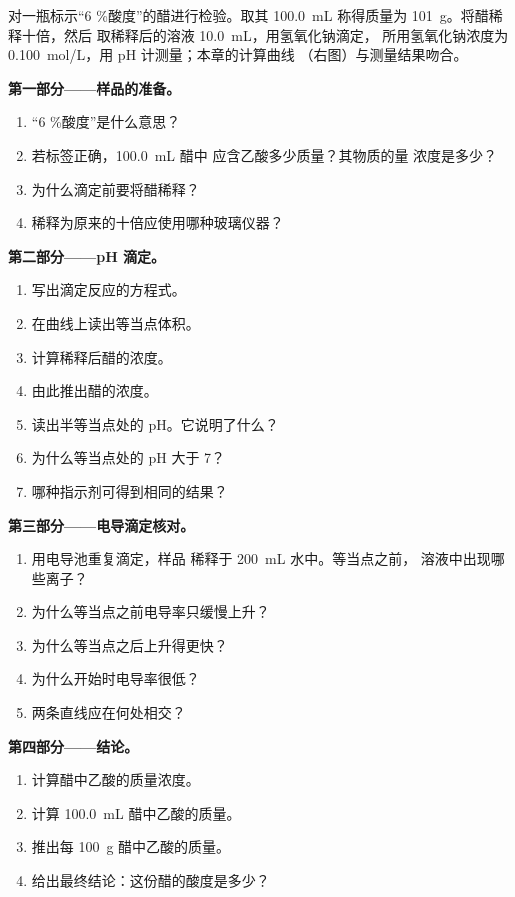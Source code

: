 \begin{problem}
\label{pb:g12:ph-conductivity-titrations:1}
对一瓶标示“6 \%酸度”的醋进行检验。取其 \qty{100.0}{mL}
称得质量为 \qty{101}{g}。将醋稀释十倍，然后
取稀释后的溶液 \qty{10.0}{mL}，用氢氧化钠滴定，
所用氢氧化钠浓度为 \qty{0.100}{mol/L}，用 pH 计测量；本章的计算曲线
（右图）与测量结果吻合。

\medskip
\noindent\textbf{第一部分——样品的准备。}
\begin{enumerate}
  \item “6 \%酸度”是什么意思？
  \item 若标签正确，\qty{100.0}{mL} 醋中
        应含乙酸多少质量？其物质的量
        浓度是多少？
  \item 为什么滴定前要将醋稀释？
  \item 稀释为原来的十倍应使用哪种玻璃仪器？
\end{enumerate}

\medskip
\noindent\textbf{第二部分——pH 滴定。}
\begin{enumerate}[resume]
  \item 写出滴定反应的方程式。
  \item 在曲线上读出等当点体积。
  \item 计算稀释后醋的浓度。
  \item 由此推出醋的浓度。
  \item 读出半等当点处的 pH。它说明了什么？
  \item 为什么等当点处的 pH 大于 7？
  \item 哪种指示剂可得到相同的结果？
\end{enumerate}

\medskip
\noindent\textbf{第三部分——电导滴定核对。}
\begin{enumerate}[resume]
  \item 用电导池重复滴定，样品
        稀释于 \qty{200}{mL} 水中。等当点之前，
        溶液中出现哪些离子？
  \item 为什么等当点之前电导率只缓慢上升？
  \item 为什么等当点之后上升得更快？
  \item 为什么开始时电导率很低？
  \item 两条直线应在何处相交？
\end{enumerate}

\medskip
\noindent\textbf{第四部分——结论。}
\begin{enumerate}[resume]
  \item 计算醋中乙酸的质量浓度。
  \item 计算 \qty{100.0}{mL} 醋中乙酸的质量。
  \item 推出每 \qty{100}{g} 醋中乙酸的质量。
  \item 给出最终结论：这份醋的酸度是多少？
\end{enumerate}
\end{problem}
